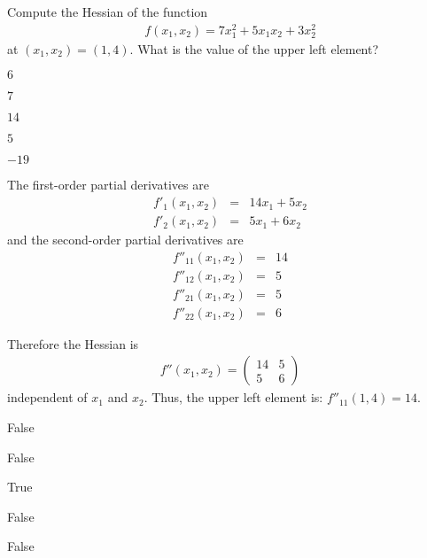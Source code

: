 
\begin{question}
Compute the Hessian of the function
\begin{eqnarray*}
  f(x_1, x_2) = 7 x_1^{2} + 5  x_1  x_2 + 3  x_2^{2}
\end{eqnarray*}
at $(x_1, x_2) = (1, 4)$.
What is the value of the upper left element?

\begin{answerlist}
  \item $6$
  \item $7$
  \item $14$
  \item $5$
  \item $-19$
\end{answerlist}\end{question}

\begin{solution}
The first-order partial derivatives are 
\begin{eqnarray*}
  f'_1(x_1, x_2) &=& 14 x_1 + 5 x_2  \\
  f'_2(x_1, x_2) &=& 5 x_1 + 6 x_2
\end{eqnarray*}
and the second-order partial derivatives are
\begin{eqnarray*}
  f''_{11}(x_1, x_2) &=& 14\\
  f''_{12}(x_1, x_2) &=& 5\\
  f''_{21}(x_1, x_2) &=& 5\\
  f''_{22}(x_1, x_2) &=& 6
\end{eqnarray*}

Therefore the Hessian is
\begin{eqnarray*}
  f''(x_1, x_2) = \left( \begin{array}{rr} 14 &  5 \\  5 &  6 \end{array} \right)
\end{eqnarray*}
independent of $x_1$ and $x_2$. Thus, the upper left element is:
$f''_{11}(1, 4) = 14$.


\begin{answerlist}
  \item False
  \item False
  \item True
  \item False
  \item False
\end{answerlist}
\end{solution}

